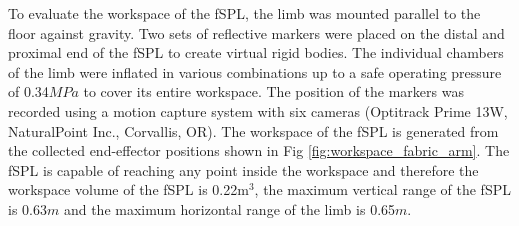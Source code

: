 \documentclass[letterpaper, 10 pt, conference]{ieeeconf}  %
\begin{document}
To evaluate the workspace of the fSPL, the limb was mounted parallel to the floor against gravity. Two sets of reflective markers were placed on the distal and proximal end of the fSPL to create virtual rigid bodies. The individual chambers of the limb were inflated in various combinations up to a safe operating pressure of 0.34$MPa$ to cover its entire workspace. The position of the markers was recorded using a motion capture system with six cameras (Optitrack Prime 13W, NaturalPoint Inc., Corvallis, OR). The workspace of the fSPL is generated from the collected end-effector positions shown in Fig \ref{fig:workspace_fabric_arm}. The fSPL is capable of reaching any point inside the workspace and therefore the workspace volume of the fSPL is 0.22m$^{3}$, the maximum vertical range of the fSPL is 0.63$m$ and the maximum horizontal range of the limb is 0.65$m$. 










\end{document}
